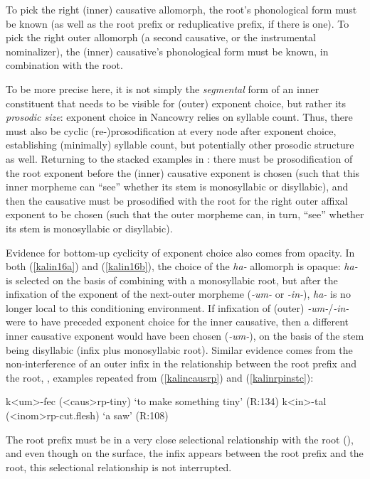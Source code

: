 \documentclass[output=paper]{langscibook}
\begin{document}
\noindent To pick the right (inner) causative allomorph, the root's phonological form must be known (as well as the root prefix or reduplicative prefix, if there is one). To pick the right outer allomorph (a second causative, or the instrumental nominalizer), the (inner) causative's phonological form must be known, in combination with the root.

To be more precise here, it is not simply the {\it segmental} form of an inner constituent that needs to be visible for (outer) exponent choice, but rather its {\it prosodic size}: exponent choice in Nancowry relies on syllable count. Thus, there must also be cyclic (re-)prosodification at every node after exponent choice, establishing (minimally) syllable count, but potentially other prosodic structure as well. Returning to the stacked examples in \Last: there must be prosodification of the root exponent before the (inner) causative exponent is chosen (such that this inner morpheme can ``see'' whether its stem is monosyllabic or disyllabic), and then the causative must be prosodified with the root for the right outer affixal exponent to be chosen (such that the outer morpheme can, in turn, ``see'' whether its stem is monosyllabic or disyllabic). 

Evidence for bottom-up cyclicity of exponent choice also comes from opacity. In both (\ref{kalin16a}) and (\ref{kalin16b}), the choice of the \textit{ha-} allomorph is opaque: \textit{ha-} is selected on the basis of combining with a monosyllabic root, but after the infixation of the exponent of the next-outer morpheme (\textit{-um-} or \textit{-in-}), \textit{ha-} is no longer local to this conditioning environment. If infixation of (outer)  \textit{-um-}/\textit{-in-} were to have preceded exponent choice for the inner causative, then a different inner causative exponent would have been chosen (\textit{-um-}), on the basis of the stem being disyllabic (infix plus monosyllabic root). Similar evidence comes from the non-interference of an outer infix in the relationship between the root prefix and the root, \Next, examples repeated from (\ref{kalincausrp}) and (\ref{kalinrpinstc}):

\ea \label{kalin17}
\ea k<um>-fec ({\sc <caus>}{\sc rp-}tiny) \hfill  `to make something tiny'  (R:134)\label{kalin17a}
\ex k<in>-tal ({\sc <inom>rp-}cut.flesh) \hfill `a saw' (R:108)\label{kalin17b}
\z
\z

\noindent The root prefix must be in a very close selectional relationship with the root (), and even though on the surface, the infix appears between the root prefix and the root, this selectional relationship is not interrupted. 
\end{document}

